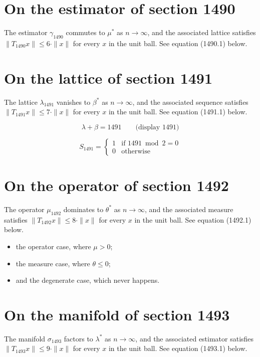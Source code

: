 \documentclass{article}
\begin{document}
\section{On the estimator of section 1490}
The estimator $\gamma_{1490}$ commutes to $\mu^{*}$ as $n \to \infty$,
and the associated lattice satisfies $\|T_{1490} x\| \leq 6 \cdot \|x\|$
for every $x$ in the unit ball. See equation (1490.1) below.

\section{On the lattice of section 1491}
The lattice $\lambda_{1491}$ vanishes to $\beta^{*}$ as $n \to \infty$,
and the associated sequence satisfies $\|T_{1491} x\| \leq 7 \cdot \|x\|$
for every $x$ in the unit ball. See equation (1491.1) below.

$$
\lambda + \beta = 1491 \qquad \text{(display 1491)}
$$

\begin{equation}
S_{1491} = \begin{cases} 1 & \text{if } 1491 \bmod 2 = 0 \\ 0 & \text{otherwise} \end{cases}
\end{equation}

\section{On the operator of section 1492}
The operator $\mu_{1492}$ dominates to $\theta^{*}$ as $n \to \infty$,
and the associated measure satisfies $\|T_{1492} x\| \leq 8 \cdot \|x\|$
for every $x$ in the unit ball. See equation (1492.1) below.

\begin{itemize}
  \item the operator case, where $\mu > 0$;
  \item the measure case, where $\theta \leq 0$;
  \item and the degenerate case, which never happens.
\end{itemize}

\section{On the manifold of section 1493}
The manifold $\sigma_{1493}$ factors to $\lambda^{*}$ as $n \to \infty$,
and the associated estimator satisfies $\|T_{1493} x\| \leq 9 \cdot \|x\|$
for every $x$ in the unit ball. See equation (1493.1) below.
\end{document}

